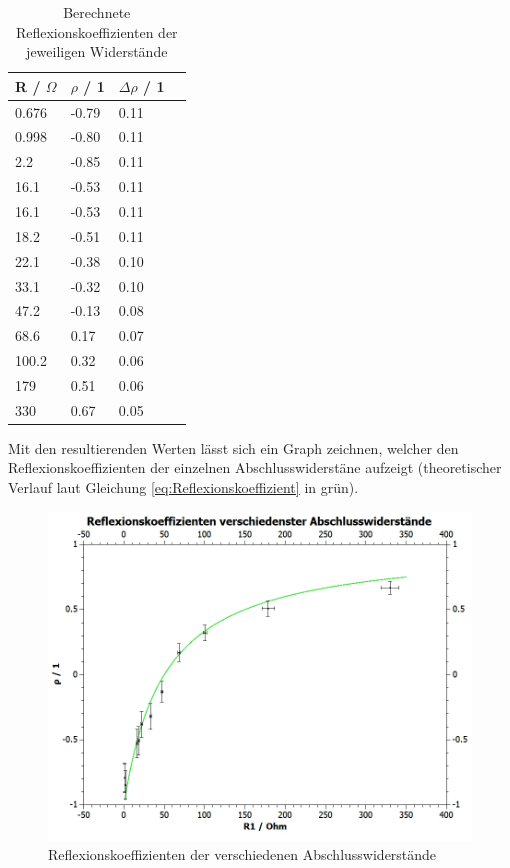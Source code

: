 \documentclass[12pt,a4paper,twoside]{article}
\begin{document}
\begin{table}[H]
    \centering
    \caption{Berechnete Reflexionskoeffizienten der jeweiligen Widerstände}
    \label{tab:Reflexionskoeffizienten}
    \begin{tabular}{| l | l | l | l |}
        \hline
        R / $\Omega$  & $\rho$ / 1 & $\Delta \rho$ / 1 \\
        \hline
       0.676 & -0.79 & 0.11 \\
       0.998 & -0.80 & 0.11 \\
         2.2 & -0.85 & 0.11 \\
        16.1 & -0.53 & 0.11 \\
        16.1 & -0.53 & 0.11 \\
        18.2 & -0.51 & 0.11 \\
        22.1 & -0.38 & 0.10 \\
        33.1 & -0.32 & 0.10 \\
        47.2 & -0.13 & 0.08 \\
        68.6 &  0.17 & 0.07 \\
       100.2 &  0.32 & 0.06 \\
         179 &  0.51 & 0.06 \\
         330 &  0.67 & 0.05 \\
        \hline
    \end{tabular}
\end{table}

\noindent
Mit den resultierenden Werten lässt sich ein Graph zeichnen, welcher den Reflexionskoeffizienten der einzelnen Abschlusswiderstäne aufzeigt (theoretischer Verlauf laut Gleichung \ref{eq:Reflexionskoeffizient} in grün).

\begin{figure}[H]
    \centering
    \includegraphics[width=0.7\linewidth]{nudes/Reflexionskoeffizienten Graph.jpg}
    \caption{Reflexionskoeffizienten der verschiedenen Abschlusswiderstände}
    \label{fig:ReflexionskoeffizientenGraph}
\end{figure}
\end{document}
